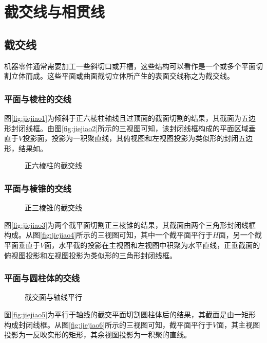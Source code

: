 \section{截交线与相贯线}
\subsection{截交线}
 机器零件通常需要加工一些斜切口或开槽，这些结构可以看作是一个或多个平面切割立体而成。这些平面或曲面截切立体所产生的表面交线称之为截交线。
 \subsubsection{平面与棱柱的交线}
图\ref{fig:jiejiao1}为倾斜于正六棱柱轴线且过顶面的截面切割的结果，其截面为五边形封闭线框。由图\ref{fig:jiejiao2}所示的三视图可知，该封闭线框构成的平面区域垂直于$V$投影面，投影为一积聚直线，其俯视图和左视图投影为类似形的封闭五边形，结果如。
 \begin{figure}[htbp]
 \centering
{}\hspace{30pt}
\caption{正六棱柱的截交线}
\end{figure}
\subsubsection{平面与棱锥的交线}
 \begin{figure}[htbp]
 \centering
{}\hspace{30pt}
\caption{正三棱锥的截交线}
\end{figure}
图\ref{fig:jiejiao3}为两个截平面切割正三棱锥的结果，其截面由两个三角形封闭线框构成。从图\ref{fig:jiejiao4}所示的三视图可知，其中一个截平面平行于$H$面，另一个截平面垂直于$V$面，水平截的投影在主视图和左视图中积聚为水平直线，正垂截面的俯视图投影和左视图投影为类似形的三角形封闭线框。

\subsubsection{平面与圆柱体的交线}
 \begin{figure}[htbp]
 \centering
{}\hspace{60pt}
\caption{截交面与轴线平行}
\end{figure}
图\ref{fig:jiejiao5}为平行于轴线的截交平面切割圆柱体后的结果，其截面是由一矩形构成封闭线框。从图\ref{fig:jiejiao6}所示的三视图可知，截平面平行于$V$面，其主视图投影为一反映实形的矩形，其余视图投影为一积聚的直线。


